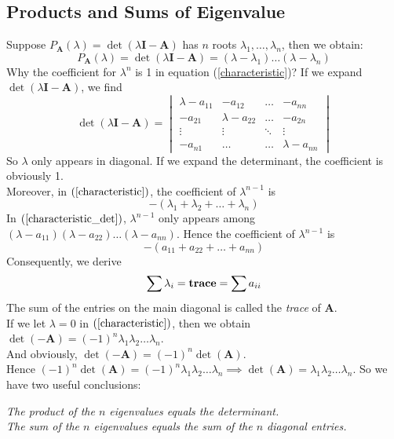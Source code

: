 \subsection{Products and Sums of Eigenvalue}
Suppose $P_{\bm A}(\lambda)=\det(\lambda\bm I-\bm A)$ has $n$ roots $\lambda_1,\dots,\lambda_n$, then we obtain:
\begin{equation}
P_{\bm A}(\lambda)=\det(\lambda\bm I-\bm A)=(\lambda-\lambda_1)\dots(\lambda-\lambda_n)
\label{characteristic}
\end{equation}
Why the coefficient for $\lambda^{n}$ is 1 in equation (\ref{characteristic})? If we expand $\det(\lambda\bm I-\bm A)$, we find
\begin{equation}
\det(\lambda\bm I-\bm A)=\begin{vmatrix}
\lambda-a_{11}&-a_{12}&\dots&-a_{nn}\\
-a_{21}&\lambda-a_{22}&\dots&-a_{2n}\\
\vdots&\vdots&\ddots&\vdots\\
-a_{n1}&\dots&\dots&\lambda-a_{nn}
\end{vmatrix}
\label{characteristic_det}
\end{equation}
So $\lambda$ only appears in diagonal. If we expand the determinant, the coefficient is obviously 1.\\
Moreover, in $(\ref{characteristic})$, the coefficient of $\lambda^{n-1}$ is
\[
-(\lambda_1+\lambda_2+\dots+\lambda_n)
\]
In $(\ref{characteristic_det})$, $\lambda^{n-1}$ only appears among $(\lambda-a_{11})(\lambda-a_{22})\dots(\lambda-a_{nn})$. Hence the coefficient of $\lambda^{n-1}$ is
\[
-(a_{11}+a_{22}+\dots+a_{nn})
\]
Consequently, we derive
\[
\sum\lambda_i=\text{\emph{trace}}=\sum a_{ii}
\]
The sum of the entries on the main diagonal is called the \emph{trace} of $\bm A$.\\
If we let $\lambda=0$ in $(\ref{characteristic})$, then we obtain $\det(-\bm A)=(-1)^n\lambda_1\lambda_2\dots\lambda_n$.  \\
And obviously, $\det(-\bm A)=(-1)^{n}\det(\bm A)$.\\
Hence $(-1)^{n}\det(\bm A)=(-1)^n\lambda_1\lambda_2\dots\lambda_n\implies
\det(\bm A)=\lambda_1\lambda_2\dots\lambda_n.$
So we have two useful conclusions:
\begin{theorem}
\emph{\textit{The product of the $n$ eigenvalues equals the determinant.}}\\
\emph{\textit{The sum of the $n$ eigenvalues equals the sum of the $n$ diagonal entries.}}
\end{theorem}
